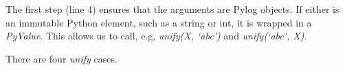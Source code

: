 







The first step (line 4) ensures that the arguments are Pylog objects. If either is an immutable Python element, such as a string or int, it is wrapped in a \textit{PyValue}. This allows us to call, e.g, \textit{unify(X, `abc')} and  \textit{unify(`abc', X)}.
   
There are four \textit{unify} cases.

